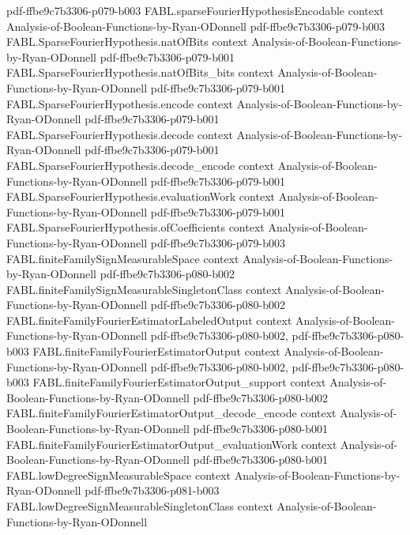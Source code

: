 \begin{theorem}
  {pdf-ffbe9c7b3306-p079-b003}
\proofstep
  {FABL.sparseFourierHypothesisEncodable}
  {context}
  {Analysis-of-Boolean-Functions-by-Ryan-ODonnell}
  {pdf-ffbe9c7b3306-p079-b003}
\proofstep
  {FABL.SparseFourierHypothesis.natOfBits}
  {context}
  {Analysis-of-Boolean-Functions-by-Ryan-ODonnell}
  {pdf-ffbe9c7b3306-p079-b001}
\proofstep
  {FABL.SparseFourierHypothesis.natOfBits_bits}
  {context}
  {Analysis-of-Boolean-Functions-by-Ryan-ODonnell}
  {pdf-ffbe9c7b3306-p079-b001}
\proofstep
  {FABL.SparseFourierHypothesis.encode}
  {context}
  {Analysis-of-Boolean-Functions-by-Ryan-ODonnell}
  {pdf-ffbe9c7b3306-p079-b001}
\proofstep
  {FABL.SparseFourierHypothesis.decode}
  {context}
  {Analysis-of-Boolean-Functions-by-Ryan-ODonnell}
  {pdf-ffbe9c7b3306-p079-b001}
\proofstep
  {FABL.SparseFourierHypothesis.decode_encode}
  {context}
  {Analysis-of-Boolean-Functions-by-Ryan-ODonnell}
  {pdf-ffbe9c7b3306-p079-b001}
\proofstep
  {FABL.SparseFourierHypothesis.evaluationWork}
  {context}
  {Analysis-of-Boolean-Functions-by-Ryan-ODonnell}
  {pdf-ffbe9c7b3306-p079-b001}
\proofstep
  {FABL.SparseFourierHypothesis.ofCoefficients}
  {context}
  {Analysis-of-Boolean-Functions-by-Ryan-ODonnell}
  {pdf-ffbe9c7b3306-p079-b003}
\proofstep
  {FABL.finiteFamilySignMeasurableSpace}
  {context}
  {Analysis-of-Boolean-Functions-by-Ryan-ODonnell}
  {pdf-ffbe9c7b3306-p080-b002}
\proofstep
  {FABL.finiteFamilySignMeasurableSingletonClass}
  {context}
  {Analysis-of-Boolean-Functions-by-Ryan-ODonnell}
  {pdf-ffbe9c7b3306-p080-b002}
\proofstep
  {FABL.finiteFamilyFourierEstimatorLabeledOutput}
  {context}
  {Analysis-of-Boolean-Functions-by-Ryan-ODonnell}
  {pdf-ffbe9c7b3306-p080-b002,
    pdf-ffbe9c7b3306-p080-b003}
\proofstep
  {FABL.finiteFamilyFourierEstimatorOutput}
  {context}
  {Analysis-of-Boolean-Functions-by-Ryan-ODonnell}
  {pdf-ffbe9c7b3306-p080-b002,
    pdf-ffbe9c7b3306-p080-b003}
\proofstep
  {FABL.finiteFamilyFourierEstimatorOutput_support}
  {context}
  {Analysis-of-Boolean-Functions-by-Ryan-ODonnell}
  {pdf-ffbe9c7b3306-p080-b002}
\proofstep
  {FABL.finiteFamilyFourierEstimatorOutput_decode_encode}
  {context}
  {Analysis-of-Boolean-Functions-by-Ryan-ODonnell}
  {pdf-ffbe9c7b3306-p080-b001}
\proofstep
  {FABL.finiteFamilyFourierEstimatorOutput_evaluationWork}
  {context}
  {Analysis-of-Boolean-Functions-by-Ryan-ODonnell}
  {pdf-ffbe9c7b3306-p080-b001}
\proofstep
  {FABL.lowDegreeSignMeasurableSpace}
  {context}
  {Analysis-of-Boolean-Functions-by-Ryan-ODonnell}
  {pdf-ffbe9c7b3306-p081-b003}
\proofstep
  {FABL.lowDegreeSignMeasurableSingletonClass}
  {context}
  {Analysis-of-Boolean-Functions-by-Ryan-ODonnell}

\end{theorem}
